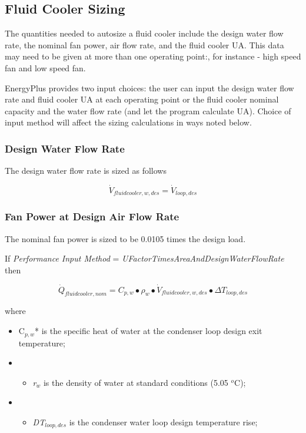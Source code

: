 \subsection{Fluid Cooler Sizing}\label{fluid-cooler-sizing}

The quantities needed to autosize a fluid cooler include the design water flow rate, the nominal fan power, air flow rate, and the fluid cooler UA. This data may need to be given at more than one operating point:, for instance - high speed fan and low speed fan.

EnergyPlus provides two input choices: the user can input the design water flow rate and fluid cooler UA at each operating point or the fluid cooler nominal capacity and the water flow rate (and let the program calculate UA). Choice of input method will affect the sizing calculations in ways noted below.

\subsubsection{Design Water Flow Rate}\label{design-water-flow-rate-1}

The design water flow rate is sized as follows

\begin{equation}
{\dot V_{fluidcooler,w,des}} = {\dot V_{loop,des}}
\end{equation}

\subsubsection{Fan Power at Design Air Flow Rate}\label{fan-power-at-design-air-flow-rate-1}

The nominal fan power is sized to be 0.0105 times the design load.

If \emph{Performance Input Method} = \emph{UFactorTimesAreaAndDesignWaterFlowRate} then

\begin{equation}
{\dot Q_{fluidcooler,nom}} = {C_{p,w}} \bullet {\rho_w} \bullet {\dot V_{fluidcooler,w,des}} \bullet \Delta {T_{loop,des}}
\end{equation}

where

\begin{itemize}
\item
  C\(_{p,w}\)* is the specific heat of water at the condenser loop design exit temperature;
\item
  \begin{itemize}
  \tightlist
  \item
    \emph{r\(_{w}\)} is the density of water at standard conditions (5.05 \(^{o}\)C);
  \end{itemize}
\item
  \begin{itemize}
  \tightlist
  \item
    \emph{DT\(_{loop,des}\)} is the condenser water loop design temperature rise;
  \end{itemize}
\end{itemize}

